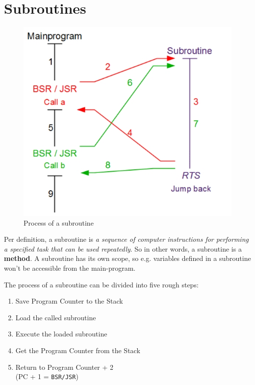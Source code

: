 \documentclass[a4paper, 11pt, nofootinbib]{book}
\newcommand{\code}[1]{\texttt{#1}}
\begin{document}
\section{Subroutines}
\begin{figure}
	\centering
	\includegraphics[keepaspectratio=true,height=15\baselineskip]{subroutine.jpg}
	\caption{Process of a subroutine}
	\label{fig:}
\end{figure}

Per definition, a subroutine is \textit{a sequence of computer instructions for performing a specified task that can be used repeatedly}. So in other words, a subroutine is a \textbf{method}. A subroutine has its own scope, so e.g. variables defined in a subroutine won't be accessible from the main-program. 

The process of a subroutine can be divided into five rough steps:

\begin{enumerate}
	\item Save Program Counter to the Stack
	\item Load the called subroutine
	\item Execute the loaded subroutine
	\item Get the Program Counter from the Stack
	\item Return to Program Counter + 2 \\
	(PC + 1 = \code{BSR/JSR})
\end{enumerate}
\end{document}
